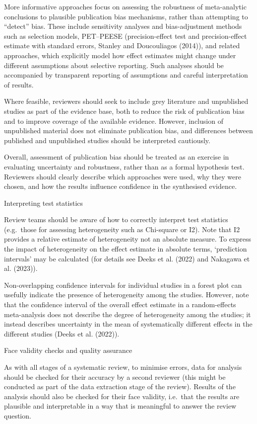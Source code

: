 \documentclass[
  letterpaper,
  DIV=11,
  numbers=noendperiod]{scrreprt}
\begin{document}
More informative approaches focus on assessing the robustness of
meta-analytic conclusions to plausible publication bias mechanisms,
rather than attempting to ``detect'' bias. These include sensitivity
analyses and bias-adjustment methods such as selection models,
PET--PEESE (precision-effect test and precision-effect estimate with
standard errors, Stanley and Doucouliagos (2014)), and related
approaches, which explicitly model how effect estimates might change
under different assumptions about selective reporting. Such analyses
should be accompanied by transparent reporting of assumptions and
careful interpretation of results.

Where feasible, reviewers should seek to include grey literature and
unpublished studies as part of the evidence base, both to reduce the
risk of publication bias and to improve coverage of the available
evidence. However, inclusion of unpublished material does not eliminate
publication bias, and differences between published and unpublished
studies should be interpreted cautiously.

Overall, assessment of publication bias should be treated as an exercise
in evaluating uncertainty and robustness, rather than as a formal
hypothesis test. Reviewers should clearly describe which approaches were
used, why they were chosen, and how the results influence confidence in
the synthesised evidence.

Interpreting test statistics

Review teams should be aware of how to correctly interpret test
statistics (e.g.~those for assessing heterogeneity such as Chi-square or
I2). Note that I2 provides a relative estimate of heterogeneity not an
absolute measure. To express the impact of heterogeneity on the effect
estimate in absolute terms, `prediction intervals' may be calculated
(for details see Deeks et al. (2022) and {Nakagawa et al.} (2023)).

Non-overlapping confidence intervals for individual studies in a forest
plot can usefully indicate the presence of heterogeneity among the
studies. However, note that the confidence interval of the overall
effect estimate in a random-effects meta-analysis does not describe the
degree of heterogeneity among the studies; it instead describes
uncertainty in the mean of systematically different effects in the
different studies (Deeks et al. (2022)).

Face validity checks and quality assurance

As with all stages of a systematic review, to minimise errors, data for
analysis should be checked for their accuracy by a second reviewer (this
might be conducted as part of the data extraction stage of the review).
Results of the analysis should also be checked for their face validity,
i.e.~that the results are plausible and interpretable in a way that is
meaningful to answer the review question.
\end{document}
